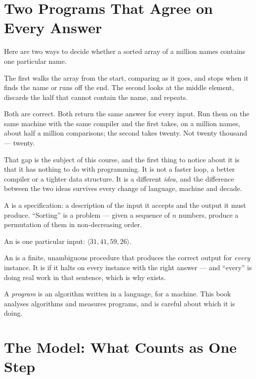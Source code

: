 \section{Two Programs That Agree on Every Answer}

Here are two ways to decide whether a sorted array of a million names contains
one particular name.

The first walks the array from the start, comparing as it goes, and stops when
it finds the name or runs off the end. The second looks at the middle element,
discards the half that cannot contain the name, and repeats.

Both are correct. Both return the same answer for every input. Run them on the
same machine with the same compiler and the first takes, on a million names,
about half a million comparisons; the second takes twenty. Not twenty thousand
--- twenty.

That gap is the subject of this course, and the first thing to notice about it
is that it has nothing to do with programming. It is not a faster loop, a
better compiler or a tighter data structure. It is a different \emph{idea},
and the difference between the two ideas survives every change of language,
machine and decade.

\begin{definitionbox}
A  is a specification: a description of the input it accepts and
the output it must produce. ``Sorting'' is a problem --- given a sequence of
$n$ numbers, produce a permutation of them in non-decreasing order.

\smallskip
An  is one particular input: $\langle 31, 41, 59, 26 \rangle$.

\smallskip
An  is a finite, unambiguous procedure that produces the
correct output for \emph{every} instance. It is  if it halts on
every instance with the right answer --- and ``every'' is doing real work in
that sentence, which is why  exists.

\smallskip
A \emph{program} is an algorithm written in a language, for a machine. This
book analyses algorithms and measures programs, and is careful about which it
is doing.
\end{definitionbox}

\section{The Model: What Counts as One Step}

